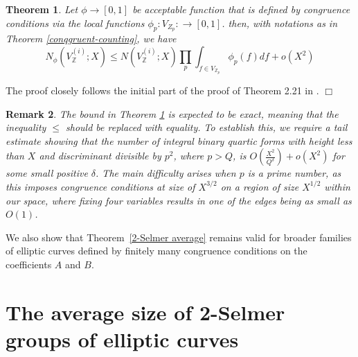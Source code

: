 \documentclass{article}
\def\Z{{\mathbb Z}}
\def\Z{{\mathbb Z}}
\newtheorem{theorem}{Theorem}[section]
\newtheorem{remark}[theorem]{Remark}
\newenvironment{proof}{\noindent {\bf Proof:}}{$\Box$ \vspace{2 ex}}
\begin{document}
\begin{theorem}\label{weight-counting-quartic}
    Let $\phi \rightarrow [0,1]$ be acceptable function that is defined by congruence conditions via the local functions $\phi_p: V_{Z_{p}}: \rightarrow[0,1]$. then, with notations as in Theorem \ref{conqgruent-counting}, we have 
    \begin{equation*}
        N_{\phi}(V_{\Z}^{(i)};X) \leq N(V_{\Z}^{(i)};X) \prod_{p}\int_{f \in V_{\Z_p}} \phi_p(f)df + o(X^2)
    \end{equation*}
\end{theorem}
\begin{proof}
The proof closely follows the initial part of the proof of Theorem 2.21 in \cite{main}.
\end{proof}

 
\begin{remark}\label{uniformity tail estimate}
The bound in Theorem \ref{weight-counting-quartic} is expected to be exact, meaning that the inequality $\leq$ should be replaced with equality. To establish this, we require a tail estimate showing that the number of integral binary quartic forms with height less than $X$ and discriminant divisible by $p^2$, where $p > Q$, is $O\left(\frac{X^2}{Q^\delta}\right) + o(X^2)$ for some small positive $\delta$. The main difficulty arises when $p$ is a prime number, as this imposes congruence conditions at size of $X^{3/2}$ on a region of size $X^{1/2}$ within our space, where fixing four variables results in one of the edges being as small as $O(1)$.
\end{remark}

We also show that Theorem~\ref{2-Selmer average} remains valid for broader families of elliptic curves defined by finitely many congruence conditions on the coefficients $A$ and $B$.
\section{The average size of 2-Selmer groups of elliptic curves}\label{sec5}
\end{document}

